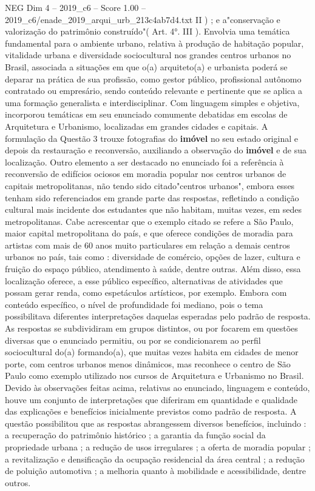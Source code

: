 \begin{textsample}{NEG Dim 4 – 2019\_c6 – Score 1.00 – 2019\_c6/enade\_2019\_arqui\_urb\_213c4ab7d4.txt}
II ) ; e a"conservação e valorização do patrimônio construído"( Art. 4{\EmojiFont °}.
III ).
Envolvia uma temática fundamental para o ambiente urbano, relativa à produção de habitação popular, vitalidade urbana e diversidade sociocultural nos grandes centros urbanos no Brasil, associada a situações em que o(a) arquiteto(a) e urbanista poderá se deparar na prática de sua profissão, como gestor público, profissional autônomo contratado ou empresário, sendo conteúdo relevante e pertinente que se aplica a uma formação generalista e interdisciplinar.
Com linguagem simples e objetiva, incorporou temáticas em seu enunciado comumente debatidas em escolas de Arquitetura e Urbanismo, localizadas em grandes cidades e capitais.
A formulação da Questão 3 trouxe fotografias do \textbf{imóvel} no seu estado original e depois da restauração e reconversão, auxiliando a observação do \textbf{imóvel} e de sua localização.
Outro elemento a ser destacado no enunciado foi a referência à reconversão de edifícios ociosos em moradia popular nos centros urbanos de capitais metropolitanas, não tendo sido citado"centros urbanos", embora esses tenham sido referenciados em grande parte das respostas, refletindo a condição cultural mais incidente dos estudantes que não habitam, muitas vezes, em sedes metropolitanas.
Cabe acrescentar que o exemplo citado se refere a São Paulo, maior capital metropolitana do país, e que oferece condições de moradia para artistas com mais de 60 anos muito particulares em relação a demais centros urbanos no país, tais como : diversidade de comércio, opções de lazer, cultura e fruição do espaço público, atendimento à saúde, dentre outras.
Além disso, essa localização oferece, a esse público específico, alternativas de atividades que possam gerar renda, como espetáculos artísticos, por exemplo.
Embora com conteúdo específico, o nível de profundidade foi mediano, pois o tema possibilitava diferentes interpretações daquelas esperadas pelo padrão de resposta.
As respostas se subdividiram em grupos distintos, ou por focarem em questões diversas que o enunciado permitiu, ou por se condicionarem ao perfil sociocultural do(a) formando(a), que muitas vezes habita em cidades de menor porte, com centros urbanos menos dinâmicos, mas reconhece o centro de São Paulo como exemplo utilizado nos cursos de Arquitetura e Urbanismo no Brasil.
Devido às observações feitas acima, relativas ao enunciado, linguagem e conteúdo, houve um conjunto de interpretações que diferiram em quantidade e qualidade das explicações e benefícios inicialmente previstos como padrão de resposta.
A questão possibilitou que as respostas abrangessem diversos benefícios, incluindo : a recuperação do patrimônio histórico ; a garantia da função social da propriedade urbana ; a redução de usos irregulares ; a oferta de moradia popular ; a revitalização e densificação da ocupação residencial da área central ; a redução de poluição automotiva ; a melhoria quanto à mobilidade e acessibilidade, dentre outros.

\end{textsample}
